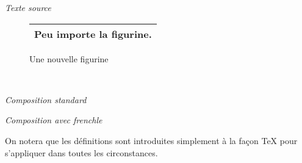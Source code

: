 \documentclass[a4paper,12pt,openright]{article}
\begin{document}
\noindent
\begin{minipage}{\textwidth}
\begin{center} %
\textit{Texte source}\\[.5ex]
{\large
\begin{boxedverbatim}
\fraddto{}

\begin{figure}
  \begin{tabular}{|c|}
    \hline
    \centerline{Peu importe la figurine.}\\
    \hline
\end{tabular}
\caption{Une nouvelle figurine}
\end{figure}
\end{boxedverbatim}
}\\[.5em]
\end{center}
\end{minipage}
\begin{center}
\setcounter{mpfootnote}{1} %
\renewcommand{\thempfootnote}{\arabic{mpfootnote}}
\parbox{60mm}{
\begin{center}
\textit{Composition standard}
%
\end{center}
}%
\parbox{65mm}{
\begin{center}
\textit{Composition avec frenchle}
\end{center}
}
%
\end{center} %

On notera que les définitions sont introduites simplement à la façon \TeX{} pour
s’appliquer dans toutes les circonstances.
\end{document}
